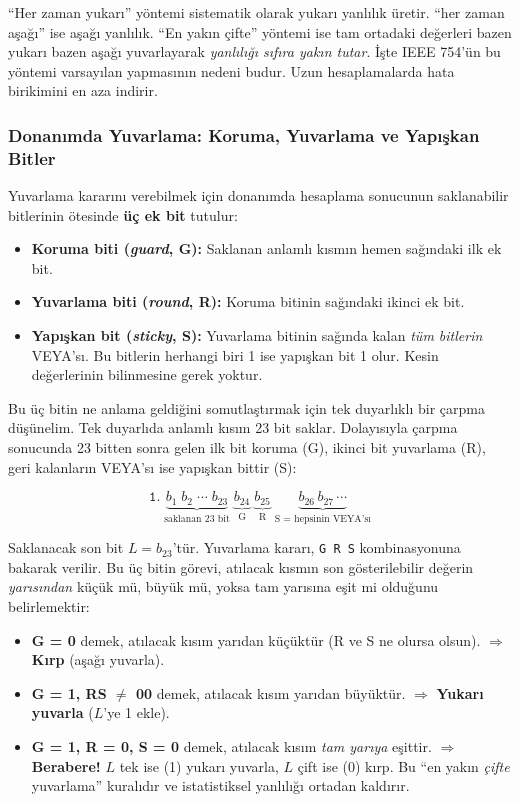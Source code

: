 ``Her zaman yukarı'' yöntemi sistematik olarak yukarı yanlılık üretir. ``her zaman aşağı'' ise aşağı yanlılık. ``En yakın çifte'' yöntemi ise tam ortadaki değerleri bazen yukarı bazen aşağı yuvarlayarak \emph{yanlılığı sıfıra yakın tutar}. İşte IEEE 754'ün bu yöntemi varsayılan yapmasının nedeni budur. Uzun hesaplamalarda hata birikimini en aza indirir.

\subsubsection{Donanımda Yuvarlama: Koruma, Yuvarlama ve Yapışkan Bitler}

Yuvarlama kararını verebilmek için donanımda hesaplama sonucunun saklanabilir bitlerinin ötesinde \textbf{üç ek bit} tutulur:

\begin{itemize}
\item \textbf{Koruma biti (\emph{guard}, G):} Saklanan anlamlı kısmın hemen sağındaki ilk ek bit.
\item \textbf{Yuvarlama biti (\emph{round}, R):} Koruma bitinin sağındaki ikinci ek bit.
\item \textbf{Yapışkan bit (\emph{sticky}, S):} Yuvarlama bitinin sağında kalan \emph{tüm bitlerin} VEYA'sı. Bu bitlerin herhangi biri 1 ise yapışkan bit 1 olur. Kesin değerlerinin bilinmesine gerek yoktur.
\end{itemize}

Bu üç bitin ne anlama geldiğini somutlaştırmak için tek duyarlıklı bir çarpma düşünelim. Tek duyarlıda anlamlı kısım 23 bit saklar. Dolayısıyla çarpma sonucunda 23 bitten sonra gelen ilk bit koruma (G), ikinci bit yuvarlama (R), geri kalanların VEYA'sı ise yapışkan bittir (S):

\[
\texttt{1.}\;\underbrace{b_1 \; b_2 \; \cdots \; b_{23}}_{\text{saklanan 23 bit}} \;\underbrace{b_{24}}_{\text{G}} \;\underbrace{b_{25}}_{\text{R}} \;\underbrace{b_{26} \, b_{27} \, \cdots}_{\text{S = hepsinin VEYA'sı}}
\]

Saklanacak son bit $L = b_{23}$'tür. Yuvarlama kararı, \texttt{G\,R\,S} kombinasyonuna bakarak verilir. Bu üç bitin görevi, atılacak kısmın son gösterilebilir değerin \emph{yarısından} küçük mü, büyük mü, yoksa tam yarısına eşit mi olduğunu belirlemektir:

\begin{itemize}
\item \textbf{G = 0} demek, atılacak kısım yarıdan küçüktür (R ve S ne olursa olsun). $\Rightarrow$ \textbf{Kırp} (aşağı yuvarla).
\item \textbf{G = 1, RS $\neq$ 00} demek, atılacak kısım yarıdan büyüktür. $\Rightarrow$ \textbf{Yukarı yuvarla} ($L$'ye 1 ekle).
\item \textbf{G = 1, R = 0, S = 0} demek, atılacak kısım \emph{tam yarıya} eşittir. $\Rightarrow$ \textbf{Berabere!} $L$ tek ise (1) yukarı yuvarla, $L$ çift ise (0) kırp. Bu ``en yakın \emph{çifte} yuvarlama'' kuralıdır ve istatistiksel yanlılığı ortadan kaldırır.
\end{itemize}

